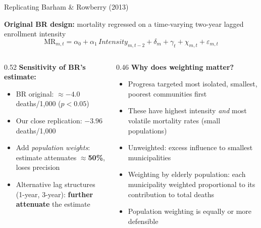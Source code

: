 \documentclass[aspectratio=169,usenames,dvipsnames]{beamer}
\begin{document}

\begin{frame}{Replicating Barham \& Rowberry (2013)}\label{br_replication}
\small

\textbf{Original BR design:} mortality regressed on a time-varying two-year lagged enrollment intensity
\begin{equation*}
\text{MR}_{m,t} = \alpha_0 + \alpha_1\,\textit{Intensity}_{m,t-2} + \delta_m + \gamma_t + \chi_{m,t} + \varepsilon_{m,t}
\end{equation*}

\vspace{8pt}

\begin{columns}[T]
  \begin{column}{0.52\textwidth}
    \textbf{Sensitivity of BR's estimate:}
    \vspace{4pt}
    \begin{itemize}
      \item[\textbf{(A)}] BR original: $\approx -4.0$ deaths/1,000 ($p<0.05$)
      \item[\textbf{(B)}] Our close replication: $-3.96$ deaths/1,000
      \vspace{4pt}
      \item[\textbf{(C)}] Add \textit{population weights}: estimate attenuates $\approx$\textbf{50\%}, loses precision
      \vspace{4pt}
      \item[\textbf{(D)-(E)}] Alternative lag structures (1-year, 3-year): \textbf{further attenuate} the estimate
    \end{itemize}
  \end{column}
  \begin{column}{0.46\textwidth}
    \textbf{Why does weighting matter?}
    \vspace{4pt}
    \begin{itemize}
      \item[$\circ$] Progresa targeted most isolated, smallest, poorest communities first
      \item[$\circ$] These have highest intensity \textit{and} most volatile mortality rates (small populations)
      \item[$\circ$] Unweighted: excess influence to smallest municipalities
      \item[$\circ$] Weighting by elderly population: each municipality weighted proportional to its contribution to total deaths
      \item[$\circ$] Population weighting is equally or more defensible
    \end{itemize}
  \end{column}
\end{columns}


\end{frame}
\end{document}
